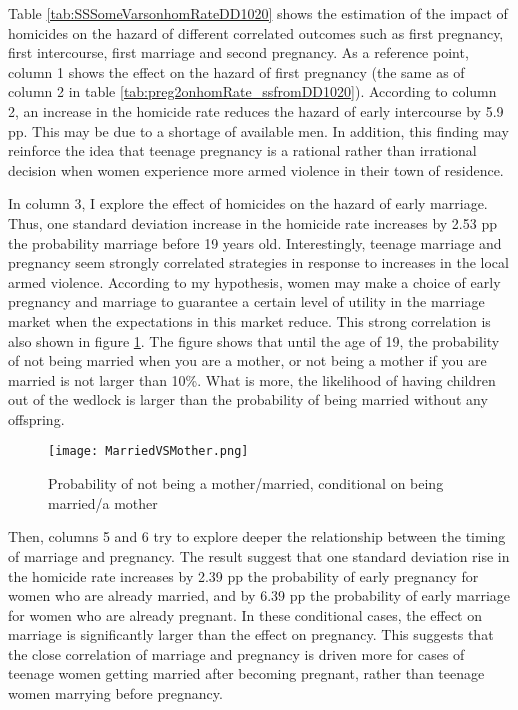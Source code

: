 \documentclass[a4paper,10pt,twocolumn,preprint,3p,authoryear]{elsarticle}
\begin{document}
Table \ref{tab:SSSomeVarsonhomRateDD1020} shows the estimation of the impact of homicides on the hazard of different correlated outcomes such as first pregnancy, first intercourse, first marriage and second pregnancy. As a reference point, column 1 shows the effect on the hazard of first pregnancy (the same as of column 2 in table \ref{tab:preg2onhomRate_ssfromDD1020}). According to column 2, an increase in the homicide rate reduces the hazard of early intercourse by 5.9 pp. This may be due to a shortage of available men. In addition, this finding may reinforce the idea that teenage pregnancy is a rational rather than irrational decision when women experience more armed violence in their town of residence. 

In column 3, I explore the effect of homicides on the hazard of early marriage. Thus, one standard deviation increase in the homicide rate increases by 2.53 pp the probability marriage before 19 years old. Interestingly, teenage marriage and pregnancy seem strongly correlated strategies in response to increases in the local armed violence. According to my hypothesis, women may make a choice of early pregnancy and marriage to guarantee a certain level of utility in the marriage market when the expectations in this market reduce. This strong correlation is also shown in figure \ref{fig:MotherVSMarriage}. The figure shows that until the age of 19, the probability of not being married when you are a mother, or not being a mother if you are married is not larger than 10\%. What is more, the likelihood of having children out of the wedlock is larger than the probability of being married without any offspring. 

\begin{figure}[h]
  \centering
	\texttt{[image: MarriedVSMother.png]}
  \caption{Probability of not being a mother/married, conditional on being married/a mother}
  \label{fig:MotherVSMarriage}
  \end{figure}

Then, columns 5 and 6 try to explore deeper the relationship between the timing of marriage and pregnancy. The result suggest that one standard deviation rise in the homicide rate increases by 2.39 pp the probability of early pregnancy for women who are already married, and by 6.39 pp the probability of early marriage for women who are already pregnant. In these conditional cases, the effect on marriage is significantly larger than the effect on pregnancy. This suggests that the close correlation of marriage and pregnancy is driven more for cases of teenage women getting married after becoming pregnant, rather than teenage women marrying before pregnancy.
\end{document}
